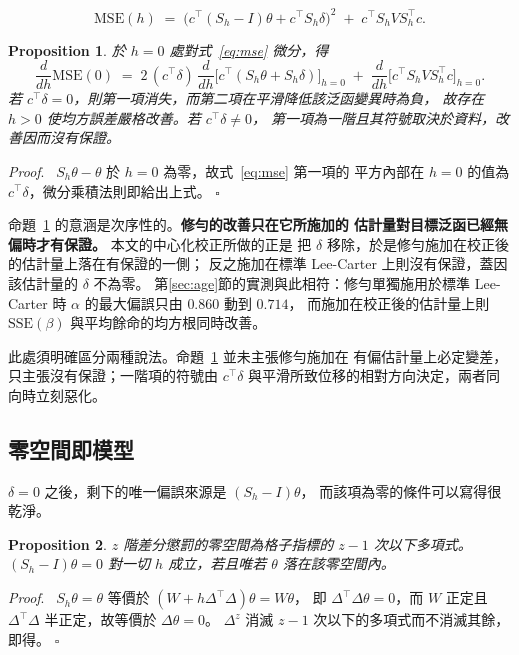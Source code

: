 \documentclass[UTF8, fontset=macnew, a4paper, 12pt]{ctexart}
\newtheorem{prop}{Proposition}
\newenvironment{proof}{\par\noindent\textit{Proof}.\ }{\hfill$\square$\par\vspace{4pt}}
\begin{document}
\begin{equation}\label{eq:mse}
\mathrm{MSE}(h)\;=\;\big(c^{\top}(S_h-I)\theta+c^{\top}S_h\delta\big)^2
\;+\;c^{\top}S_h V S_h^{\top} c .
\end{equation}

\begin{prop}\label{prop:precond}
於 $h=0$ 處對式~\eqref{eq:mse} 微分，得
$$\frac{d}{dh}\mathrm{MSE}(0)\;=\;2\,(c^{\top}\delta)\,
\frac{d}{dh}\big[c^{\top}(S_h\theta+S_h\delta)\big]_{h=0}
\;+\;\frac{d}{dh}\big[c^{\top}S_hVS_h^{\top}c\big]_{h=0}.$$
若 $c^{\top}\delta=0$，則第一項消失，而第二項在平滑降低該泛函變異時為負，
故存在 $h>0$ 使均方誤差嚴格改善。若 $c^{\top}\delta\neq0$，
第一項為一階且其符號取決於資料，改善因而沒有保證。
\end{prop}

\begin{proof}
$S_h\theta-\theta$ 於 $h=0$ 為零，故式~\eqref{eq:mse} 第一項的
平方內部在 $h=0$ 的值為 $c^{\top}\delta$，微分乘積法則即給出上式。
\end{proof}

命題~\ref{prop:precond} 的意涵是次序性的。\textbf{修勻的改善只在它所施加的 估計量對目標泛函已經無偏時才有保證。} 本文的中心化校正所做的正是
把 $\delta$ 移除，於是修勻施加在校正後的估計量上落在有保證的一側；
反之施加在標準 Lee-Carter 上則沒有保證，蓋因該估計量的 $\delta$ 不為零。
第\ref{sec:age}節的實測與此相符：修勻單獨施用於標準 Lee-Carter 時
$\alpha$ 的最大偏誤只由 $0.860$ 動到 $0.714$，
而施加在校正後的估計量上則 $\mathrm{SSE}(\beta)$ 與平均餘命的均方根同時改善。

此處須明確區分兩種說法。命題~\ref{prop:precond} 並未主張修勻施加在
有偏估計量上必定變差，只主張沒有保證；一階項的符號由
$c^{\top}\delta$ 與平滑所致位移的相對方向決定，兩者同向時立刻惡化。

\subsection{零空間即模型}\label{subsec:nullmodel}

$\delta=0$ 之後，剩下的唯一偏誤來源是 $(S_h-I)\theta$，
而該項為零的條件可以寫得很乾淨。

\begin{prop}\label{prop:null}
$z$ 階差分懲罰的零空間為格子指標的 $z-1$ 次以下多項式。
$(S_h-I)\theta=0$ 對一切 $h$ 成立，若且唯若 $\theta$ 落在該零空間內。
\end{prop}

\begin{proof}
$S_h\theta=\theta$ 等價於 $(W+h\Delta^{\top}\!\Delta)\theta=W\theta$，
即 $\Delta^{\top}\!\Delta\theta=0$，而 $W$ 正定且
$\Delta^{\top}\!\Delta$ 半正定，故等價於 $\Delta\theta=0$。
$\Delta^{z}$ 消滅 $z-1$ 次以下的多項式而不消滅其餘，即得。
\end{proof}
\end{document}
